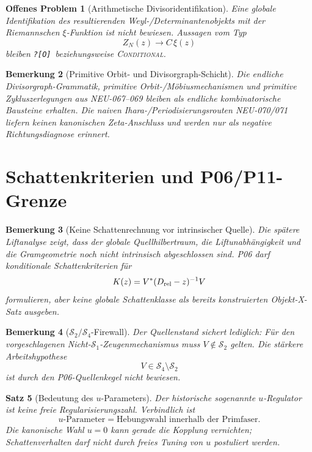 \documentclass[11pt,a4paper]{amsart}
\newtheorem{theorem}{Satz}[section]
\newtheorem{remark}[theorem]{Bemerkung}
\newtheorem{openproblem}[theorem]{Offenes Problem}
\newcommand{\Open}{\texttt{?[O]}}
\newcommand{\Conditional}{\textnormal{\textsc{Conditional}}}
\begin{document}
\begin{openproblem}[Arithmetische Divisoridentifikation]\label{op:xi}
Eine globale Identifikation des resultierenden Weyl-/Determinantenobjekts mit
der Riemannschen $\xi$-Funktion ist nicht bewiesen. Aussagen vom Typ
\[
Z_N(z)\longrightarrow C\,\xi(z)
\]
bleiben \Open\ beziehungsweise \Conditional.
\end{openproblem}

\begin{remark}[Primitive Orbit- und Divisorgraph-Schicht]
Die endliche Divisorgraph-Grammatik, primitive Orbit-/Möbiusmechanismen und
primitive Zykluszerlegungen aus NEU-067--069 bleiben als endliche
kombinatorische Bausteine erhalten. Die naiven Ihara-/Periodisierungsrouten
NEU-070/071 liefern keinen kanonischen Zeta-Anschluss und werden nur als
negative Richtungsdiagnose erinnert.
\end{remark}

\section{Schattenkriterien und P06/P11-Grenze}

\begin{remark}[Keine Schattenrechnung vor intrinsischer Quelle]\label{rem:p11-block}
Die spätere Liftanalyse zeigt, dass der globale Quellhilbertraum, die
Liftunabhängigkeit und die Gramgeometrie noch nicht intrinsisch abgeschlossen
sind. P06 darf konditionale Schattenkriterien für
\[
K(z)=V^*(D_{\rm rel}-z)^{-1}V
\]
formulieren, aber keine globale Schattenklasse als bereits konstruierten
Objekt-X-Satz ausgeben.
\end{remark}

\begin{remark}[$\mathcal S_2/\mathcal S_4$-Firewall]
Der Quellenstand sichert lediglich: Für den vorgeschlagenen
Nicht-$\mathcal S_1$-Zeugenmechanismus muss $V\notin\mathcal S_2$ gelten. Die
stärkere Arbeitshypothese
\[
V\in\mathcal S_4\setminus\mathcal S_2
\]
ist durch den P06-Quellenkegel nicht bewiesen.
\end{remark}

\begin{theorem}[Bedeutung des $u$-Parameters]\label{thm:u}
Der historische sogenannte $u$-Regulator ist keine freie Regularisierungszahl.
Verbindlich ist
\[
\boxed{u\text{-Parameter}=\text{Hebungswahl innerhalb der Primfaser}.}
\]
Die kanonische Wahl $u=0$ kann gerade die Kopplung vernichten;
Schattenverhalten darf nicht durch freies Tuning von $u$ postuliert werden.
\end{theorem}
\end{document}
